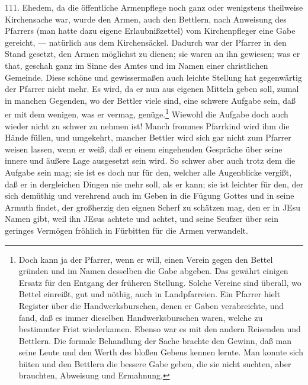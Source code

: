111. Ehedem, da die öffentliche Armenpflege noch
ganz oder wenigstens theilweise Kirchensache war, wurde den Armen, auch den Bettlern, nach Anweisung des Pfarrers (man hatte dazu eigene Erlaubnißzettel) vom Kirchenpfleger eine Gabe gereicht, — natürlich aus dem Kirchensäckel. Dadurch war der Pfarrer in den Stand gesetzt, den Armen möglichst zu dienen; sie waren an ihn gewiesen; was er that, geschah ganz im Sinne des Amtes und im Namen einer christlichen Gemeinde. Diese schöne und gewissermaßen auch leichte Stellung hat gegenwärtig der Pfarrer nicht mehr. Es wird, da er nun aus eigenen Mitteln geben soll, zumal in manchen Gegenden, wo der Bettler viele sind, eine schwere Aufgabe sein, daß er mit dem wenigen, was er vermag, genüge.\footnote{Doch kann ja der Pfarrer, wenn er will, einen Verein gegen den Bettel gründen und im Namen desselben die Gabe abgeben. Das gewährt einigen Ersatz für den Entgang der früheren Stellung. Solche Vereine sind überall, wo Bettel einreißt, gut und nöthig, auch in Landpfarreien. Ein Pfarrer hielt Register über die Handwerksburschen, denen er Gaben verabreichte, und fand, daß es immer dieselben Handwerksburschen waren, welche zu bestimmter Frist wiederkamen. Ebenso war es mit den andern Reisenden und Bettlern. Die formale Behandlung der Sache brachte den Gewinn, daß man seine Leute und den Werth des bloßen Gebens kennen lernte. Man konnte sich hüten und den Bettlern die bessere Gabe geben, die sie nicht suchten, aber brauchten, Abweisung und Ermahnung.} Wiewohl die Aufgabe doch auch wieder nicht zu schwer zu nehmen ist! Manch frommes Pfarrkind wird ihm die Hände füllen, und umgekehrt, mancher Bettler wird sich gar nicht zum Pfarrer weisen lassen, wenn er weiß, daß er einem eingehenden Gespräche über seine innere und äußere Lage ausgesetzt sein wird. So schwer aber auch trotz dem die Aufgabe
sein mag; sie ist es doch nur für den, welcher alle Augenblicke vergißt, daß er in dergleichen Dingen nie mehr soll, als er kann; sie ist leichter für den, der sich demüthig und verehrend auch im Geben in die Fügung Gottes und in seine Armuth findet, der großherzig den eignen Scherf zu schätzen mag, den er in JEsu Namen gibt, weil ihn JEsus achtete und achtet, und seine Seufzer über sein geringes Vermögen fröhlich in Fürbitten für die Armen verwandelt.

